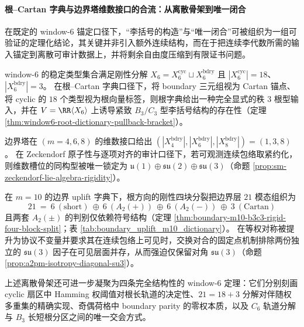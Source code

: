 
\paragraph{根--Cartan 字典与边界塔维数接口的合流：从离散骨架到唯一闭合}
在既定的 window-\(6\) 锚定口径下，“李括号的构造”与“唯一闭合”可被组织为一组可验证的定理化结论，其关键并非引入额外连续结构，而在于把连续李代数所需的输入锚定到离散可审计数据上，并将剩余自由度压缩到有限证书问题。

\begin{remark}\label{rem:window6-rootcartan-18plus3-skeleton}
window-\(6\) 的稳定类型集合满足刚性分解 \(X_6=X_6^{\mathrm{cyc}}\sqcup X_6^{\mathrm{bdry}}\) 且 \(|X_6^{\mathrm{cyc}}|=18\)、\(|X_6^{\mathrm{bdry}}|=3\)。
在根--Cartan 字典口径下，将 boundary 三元组视为 Cartan 锚点、将 cyclic 的 \(18\) 个类型视为根向量标签，则根字典给出一种完全显式的秩 \(3\) 根型输入，并在 \(V=\RR\langle X_6\rangle\) 上诱导紧致 \(B_3/C_3\) 型李括号结构的存在性（定理 \ref{thm:window6-root-dictionary-pullback-bracket}）。
\end{remark}

\begin{remark}\label{rem:window6-boundary-tower-sm-uniqueness}
边界塔在 \((m=4,6,8)\) 的维数接口给出 \((|X_4^{\mathrm{bdry}}|,|X_6^{\mathrm{bdry}}|,|X_8^{\mathrm{bdry}}|)=(1,3,8)\)。
在 Zeckendorf 原子性与逐项对齐的审计口径下，若可观测连续包络取紧约化，则维数槽位的同构型被唯一锁定为 \(\mathfrak u(1)\oplus\mathfrak{su}(2)\oplus\mathfrak{su}(3)\)（命题 \ref{prop:sm-zeckendorf-lie-algebra-rigidity}）。
\end{remark}

\begin{remark}\label{rem:window6-m10-a2pm-diagonal-su3}
在 \(m=10\) 的边界 uplift 字典下，根方向的刚性四块分裂把边界层 \(21\) 模态组织为
\[
21\ =\ 6\ (\mathrm{short})\ \oplus\ 6\ (A_2(+))\ \oplus\ 6\ (A_2(-))\ \oplus\ 3\ (\mathrm{Cartan})
\]
且两套 \(A_2(\pm)\) 的判别仅依赖符号结构（定理 \ref{thm:boundary-m10-b3c3-rigid-four-block-split}；表 \ref{tab:boundary_uplift_m10_dictionary}）。
在等权对称被提升为协议不变量并要求其在连续包络上可见时，交换对合的固定点机制排除两份独立的 \(\mathfrak{su}(3)\) 因子在可见层面并存，从而强迫仅保留对角 \(\mathfrak{su}(3)\)（命题 \ref{prop:a2pm-isotropy-diagonal-su3}）。
\end{remark}

上述离散骨架还可进一步凝聚为四条完全结构性的 window-\(6\) 定理：它们分别刻画 cyclic 扇区中 Hamming 权阈值对根长轨道的决定性、\(21=18+3\) 分解对伴随权多重集的精确实现、奇偶荷格中 boundary parity 的零权本质，以及 \(C_6\) 轨道分解与 \(B_3\) 长短根分区之间的唯一交会方式。


